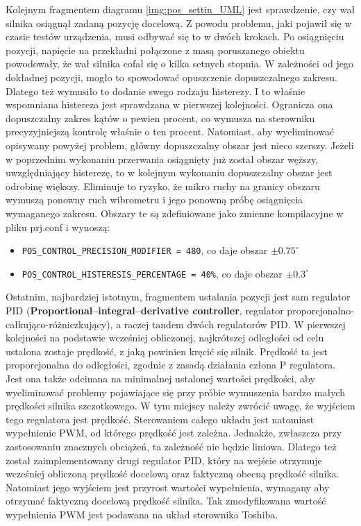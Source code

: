 Kolejnym fragmentem diagramu \ref{img:pos_settin_UML} jest sprawdzenie, czy wał silnika osiągnął zadaną pozycję docelową. Z powodu problemu, jaki pojawił się w czasie testów urządzenia, musi odbywać się to w dwóch krokach. Po osiągnięciu pozycji, napięcie na przekładni połączone z masą poruszanego obiektu powodowały, że wał silnika cofał się o kilka setnych stopnia. W zależności od jego dokładnej pozycji, mogło to spowodować opuszczenie dopuszczalnego zakresu. Dlatego też wymusiło to dodanie swego rodzaju histerezy. I to właśnie wspomniana histereza jest sprawdzana w pierwszej kolejności. Ogranicza ona dopuszczalny zakres kątów o pewien procent, co wymusza na sterowniku precyzyjniejszą kontrolę właśnie o ten procent. Natomiast, aby wyeliminować opisywany powyżej problem, główny dopuszczalny obszar jest nieco szerszy. Jeżeli w poprzednim wykonaniu przerwania osiągnięty już został obszar węższy, uwzględniający histerezę, to w kolejnym wykonaniu dopuszczalny obszar jest odrobinę większy. Eliminuje to ryzyko, że mikro ruchy na granicy obszaru wymuszą ponowny ruch wibrometru i jego ponowną próbę osiągnięcia wymaganego zakresu. Obszary te są zdefiniowane jako zmienne kompilacyjne w pliku prj.conf i wynoszą:
\vspace{-\topsep}
\begin{itemize}
    \item \texttt{POS\_CONTROL\_PRECISION\_MODIFIER = 480}, co daje obszar $\pm 0.75^{\circ}$
    \item \texttt{POS\_CONTROL\_HISTERESIS\_PERCENTAGE = 40\%}, co daje obszar $\pm 0.3^{\circ}$
\end{itemize}

Ostatnim, najbardziej istotnym, fragmentem ustalania pozycji jest sam regulator PID (\textbf{Proportional–integral–derivative controller}, regulator proporcjonalno-całkująco-różniczkujący), a raczej tandem dwóch regulatorów PID. W pierwszej kolejności na podstawie wcześniej obliczonej, najkrótszej odległości od celu ustalona zostaje prędkość, z jaką powinien kręcić się silnik. Prędkość ta jest proporcjonalna do odległości, zgodnie z zasadą działania człona P regulatora. Jest ona także odcinana na minimalnej ustalonej wartości prędkości, aby wyeliminować problemy pojawiające się przy próbie wymuszenia bardzo małych prędkości silnika szczotkowego. W tym miejscy należy zwrócić uwagę, że wyjściem tego regulatora jest prędkość. Sterowaniem całego układu jest natomiast wypełnienie PWM, od którego prędkość jest zależna. Jednakże, zwłaszcza przy zastosowaniu znacznych obciążeń, ta zależność nie będzie liniowa. Dlatego też został zaimplementowany drugi regulator PID, który na wejście otrzymuje wcześniej obliczoną prędkość docelową oraz faktyczną obecną prędkość silnika. Natomiast jego wyjściem jest przyrost wartości wypełnienia,  wymagany aby otrzymać faktyczną docelową prędkość silnika. Tak zmodyfikowana wartość wypełnienia PWM jest podawana na układ sterownika Toshiba.

